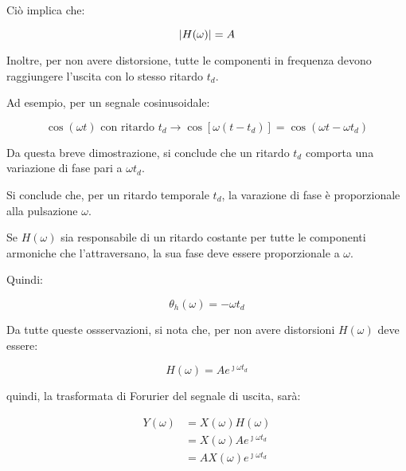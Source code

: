 Ciò implica che: 

{
    \Large 
    \begin{equation}
        \abs{H(\omega)} = A
    \end{equation}
}

Inoltre, per non avere distorsione, tutte le componenti in frequenza devono raggiungere l'uscita con lo stesso ritardo $t_d$. \newline 

Ad esempio, per un segnale cosinusoidale: 

{
    \Large 
    \begin{equation}
        \cos(\omega t) \text{ con ritardo $t_d$} 
        \rightarrow 
        \cos[\omega (t - t_d)] = \cos(\omega t -\omega t_d)
    \end{equation}
}

Da questa breve dimostrazione, si conclude che un ritardo $t_d$ comporta una variazione di fase 
pari a $\omega t_d$. \newline 

Si conclude che, per un ritardo temporale $t_d$, la varazione di fase è proporzionale alla pulsazione $\omega$. \newline 

Se $H(\omega)$ sia responsabile di un ritardo costante per tutte le componenti 
armoniche che l'attraversano, la sua fase deve essere proporzionale a $\omega$. \newline 

Quindi: 

{
    \Large 
    \begin{equation}
        \theta_h (\omega) = -\omega t_d
    \end{equation}
}

Da tutte queste ossservazioni, si nota che, per non avere distorsioni $H(\omega)$ deve essere: 

{
    \Large 
    \begin{equation}
        H(\omega) = A e^{\jmath \omega t_d}
    \end{equation}
}

quindi, la trasformata di Forurier del segnale di uscita, sarà: 

{
    \Large 
    \begin{equation} 
        \begin{split}
            Y(\omega) 
            &= X(\omega) H(\omega) 
            \\ 
            &= X(\omega) A e^{\jmath \omega t_d} 
            \\ 
            &= A X(\omega) e^{\jmath \omega t_d}
        \end{split} 
    \end{equation}
}

